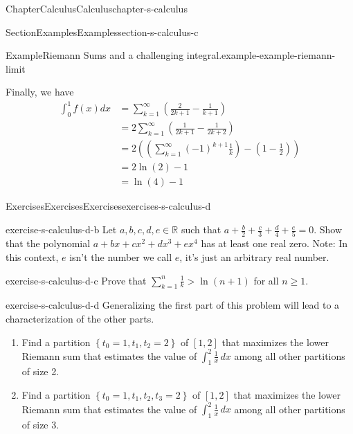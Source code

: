 \documentclass[oneside,10pt,]{book}
\numberwithin{equation}{section}
\begin{document}
\begin{chapterptx}{Chapter}{Calculus}{}{Calculus}{}{}{chapter-s-calculus}
\begin{sectionptx}{Section}{Examples}{}{Examples}{}{}{section-s-calculus-c}
\begin{example}{Example}{Riemann Sums and a challenging integral.}{example-example-riemann-limit}
\par
Finally, we have%
\begin{equation*}
\begin{split}
\int_{0}^{1} f(x) dx & = \sum_{k=1}^{\infty} \left( \frac{2}{2k+1}-  \frac{1}{k+1} \right) \\
&  = 2 \sum_{k=1}^{\infty} \left( \frac{1}{2k+1} - \frac{1}{2k+2} \right) \\
&  = 2 \left(\left( \sum_{k=1}^{\infty} (-1)^{k+1}\frac{1}{k}\right)  - (1-\frac{1}{2}) \right)\\
& = 2 \ln(2) - 1\\
& = \ln(4) - 1
\end{split}
\end{equation*}
%
\end{example}
\end{sectionptx}
%
%
\typeout{************************************************}
\typeout{************************************************}
%
\begin{exercises-section}{Exercises}{Exercises}{}{Exercises}{}{}{exercises-s-calculus-d}
\begin{divisionexercise}{1}{}{}{exercise-s-calculus-d-b}%
Let \(a,b,c,d,e \in \mathbb{R}\) such that \(a + \frac{b}{2} + \frac{c}{3} + \frac{d}{4} + \frac{e}{5} = 0\). Show that the polynomial \(a+bx+c x^2 +d x^3 +e x^4\) has at least one real zero. Note: In this context, \(e\) isn't the number we call \(e\), it's just an arbitrary real number.%
\end{divisionexercise}%
\begin{divisionexercise}{2}{}{}{exercise-s-calculus-d-c}%
Prove that \(\sum _{k=1}^n \frac{1}{k}>\ln  (n+1)\)  for all \(n\geq 1\).%
\end{divisionexercise}%
\begin{divisionexercise}{3}{}{}{exercise-s-calculus-d-d}%
Generalizing the first part of this problem will lead to a characterization of the other parts.%
\begin{enumerate}[label=(\alph*)]
\item{}Find a partition \(\left\{t_0=1,t_1,t_2=2\right\}\) of \([1,2]\) that maximizes the lower Riemann sum that estimates the value of \(\int_1^2 \frac{1}{x} \, dx\) among all other partitions of size 2.%
\item{}Find a partition \(\left\{t_0=1,t_1,t_2,t_3=2\right\}\) of \([1,2]\) that maximizes the lower Riemann sum that estimates the value of \(\int_1^2 \frac{1}{x} \, dx\) among all other partitions of size 3.%

\end{enumerate}
\end{divisionexercise}
\end{exercises-section}
\end{chapterptx}
\end{document}
